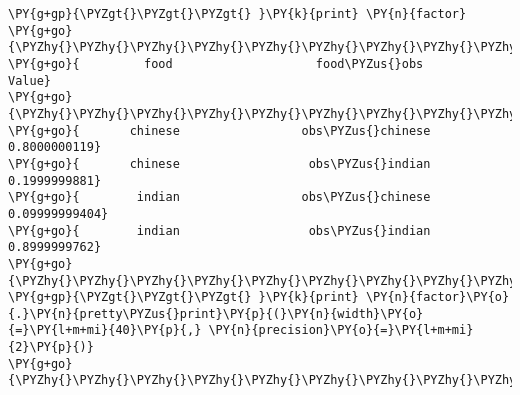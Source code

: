 \begin{example}
\begin{Verbatim}[commandchars=\\\{\}]
\PY{g+gp}{\PYZgt{}\PYZgt{}\PYZgt{} }\PY{k}{print} \PY{n}{factor}
\PY{g+go}{\PYZhy{}\PYZhy{}\PYZhy{}\PYZhy{}\PYZhy{}\PYZhy{}\PYZhy{}\PYZhy{}\PYZhy{}\PYZhy{}\PYZhy{}\PYZhy{}\PYZhy{}\PYZhy{}\PYZhy{}\PYZhy{}\PYZhy{}\PYZhy{}\PYZhy{}\PYZhy{}\PYZhy{}\PYZhy{}\PYZhy{}\PYZhy{}\PYZhy{}\PYZhy{}\PYZhy{}\PYZhy{}\PYZhy{}\PYZhy{}\PYZhy{}\PYZhy{}\PYZhy{}\PYZhy{}\PYZhy{}\PYZhy{}\PYZhy{}\PYZhy{}\PYZhy{}\PYZhy{}\PYZhy{}\PYZhy{}\PYZhy{}\PYZhy{}\PYZhy{}\PYZhy{}\PYZhy{}\PYZhy{}\PYZhy{}\PYZhy{}\PYZhy{}\PYZhy{}\PYZhy{}\PYZhy{}\PYZhy{}\PYZhy{}\PYZhy{}\PYZhy{}\PYZhy{}\PYZhy{}\PYZhy{}\PYZhy{}\PYZhy{}\PYZhy{}\PYZhy{}\PYZhy{}\PYZhy{}\PYZhy{}\PYZhy{}\PYZhy{}}
\PY{g+go}{         food                    food\PYZus{}obs                 Value}
\PY{g+go}{\PYZhy{}\PYZhy{}\PYZhy{}\PYZhy{}\PYZhy{}\PYZhy{}\PYZhy{}\PYZhy{}\PYZhy{}\PYZhy{}\PYZhy{}\PYZhy{}\PYZhy{}\PYZhy{}\PYZhy{}\PYZhy{}\PYZhy{}\PYZhy{}\PYZhy{}\PYZhy{}\PYZhy{}\PYZhy{}\PYZhy{}\PYZhy{}\PYZhy{}\PYZhy{}\PYZhy{}\PYZhy{}\PYZhy{}\PYZhy{}\PYZhy{}\PYZhy{}\PYZhy{}\PYZhy{}\PYZhy{}\PYZhy{}\PYZhy{}\PYZhy{}\PYZhy{}\PYZhy{}\PYZhy{}\PYZhy{}\PYZhy{}\PYZhy{}\PYZhy{}\PYZhy{}\PYZhy{}\PYZhy{}\PYZhy{}\PYZhy{}\PYZhy{}\PYZhy{}\PYZhy{}\PYZhy{}\PYZhy{}\PYZhy{}\PYZhy{}\PYZhy{}\PYZhy{}\PYZhy{}\PYZhy{}\PYZhy{}\PYZhy{}\PYZhy{}\PYZhy{}\PYZhy{}\PYZhy{}\PYZhy{}\PYZhy{}\PYZhy{}}
\PY{g+go}{       chinese                 obs\PYZus{}chinese             0.8000000119}
\PY{g+go}{       chinese                  obs\PYZus{}indian             0.1999999881}
\PY{g+go}{        indian                 obs\PYZus{}chinese            0.09999999404}
\PY{g+go}{        indian                  obs\PYZus{}indian             0.8999999762}
\PY{g+go}{\PYZhy{}\PYZhy{}\PYZhy{}\PYZhy{}\PYZhy{}\PYZhy{}\PYZhy{}\PYZhy{}\PYZhy{}\PYZhy{}\PYZhy{}\PYZhy{}\PYZhy{}\PYZhy{}\PYZhy{}\PYZhy{}\PYZhy{}\PYZhy{}\PYZhy{}\PYZhy{}\PYZhy{}\PYZhy{}\PYZhy{}\PYZhy{}\PYZhy{}\PYZhy{}\PYZhy{}\PYZhy{}\PYZhy{}\PYZhy{}\PYZhy{}\PYZhy{}\PYZhy{}\PYZhy{}\PYZhy{}\PYZhy{}\PYZhy{}\PYZhy{}\PYZhy{}\PYZhy{}\PYZhy{}\PYZhy{}\PYZhy{}\PYZhy{}\PYZhy{}\PYZhy{}\PYZhy{}\PYZhy{}\PYZhy{}\PYZhy{}\PYZhy{}\PYZhy{}\PYZhy{}\PYZhy{}\PYZhy{}\PYZhy{}\PYZhy{}\PYZhy{}\PYZhy{}\PYZhy{}\PYZhy{}\PYZhy{}\PYZhy{}\PYZhy{}\PYZhy{}\PYZhy{}\PYZhy{}\PYZhy{}\PYZhy{}\PYZhy{}}
\PY{g+gp}{\PYZgt{}\PYZgt{}\PYZgt{} }\PY{k}{print} \PY{n}{factor}\PY{o}{.}\PY{n}{pretty\PYZus{}print}\PY{p}{(}\PY{n}{width}\PY{o}{=}\PY{l+m+mi}{40}\PY{p}{,} \PY{n}{precision}\PY{o}{=}\PY{l+m+mi}{2}\PY{p}{)}
\PY{g+go}{\PYZhy{}\PYZhy{}\PYZhy{}\PYZhy{}\PYZhy{}\PYZhy{}\PYZhy{}\PYZhy{}\PYZhy{}\PYZhy{}\PYZhy{}\PYZhy{}\PYZhy{}\PYZhy{}\PYZhy{}\PYZhy{}\PYZhy{}\PYZhy{}\PYZhy{}\PYZhy{}\PYZhy{}\PYZhy{}\PYZhy{}\PYZhy{}\PYZhy{}\PYZhy{}\PYZhy{}\PYZhy{}\PYZhy{}\PYZhy{}\PYZhy{}\PYZhy{}\PYZhy{}\PYZhy{}\PYZhy{}\PYZhy{}\PYZhy{}\PYZhy{}\PYZhy{}\PYZhy{}}

\end{Verbatim}
\end{example}
